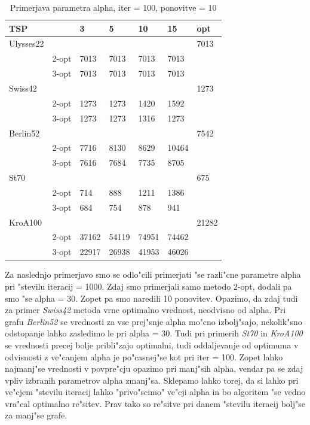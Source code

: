 \documentclass[12pt,a4paper]{amsart}
\theoremstyle{definition} %
\theoremstyle{plain} %
\begin{document}
\begin{table}[H]
\caption{Primerjava parametra alpha, iter = 100, ponovitve = 10}
\begin{tabular}{lllllll}
\rowcolor[HTML]{FFCCC9} 
TSP       &      & 3 & 5 & 10 & 15 &opt \\ \hline
Ulysses22 &      &   &   &    &  &7013  \\
          & 2-opt & 7013  &  7013 & 7013   & 7013   &\\
          & 3-opt &   7013&  7013 &  7013  &  7013 & \\
Swiss42   &      &   &   &    &   &1273 \\
	& 2-opt &   1273&  1273 &   1420 &  1592 & \\
          & 3-opt &  1273 &  1273 & 1316   &  1273 & \\
Berlin52 &      &   &   &    &   &7542 \\
	 & 2-opt &  7716 & 8130 &   8629 &  10464 & \\
          & 3-opt &  7616 &  7684 &  7735  & 8705  & \\
St70      &      &   &   &    &  & 675 \\
	& 2-opt &  714 &  888 &   1211 &  1386 & \\
          & 3-opt &  684 &  754 &   878 &   941& \\
KroA100   &      &   &   &    &  &21282  \\
	& 2-opt &  37162 &  54119 &   74951 &   74462& \\
          & 3-opt &  22917 &  26938 &  41953  & 46026  &
\end{tabular}
\end{table}

Za naslednjo primerjavo smo se odlo"cili primerjati "se razli"cne parametre alpha pri "stevilu iteracij = 1000. Zdaj smo primerjali samo metodo 2-opt, dodali pa smo "se alpha = 30. Zopet pa smo naredili 10 ponovitev. 
Opazimo, da zdaj tudi za primer \textit{Swiss42} metoda vrne optimalno vrednost, neodvisno od alpha. Pri grafu \textit{Berlin52} se vrednosti za vse prej"snje alpha mo"cno izbolj"sajo, nekolik"sno odstopanje lahko zasledimo le pri alpha = 30. Tudi pri primerih \textit{St70} in  \textit{KroA100} se vrednosti precej bolje pribli"zajo optimalni, tudi oddaljevanje od optimuma v odvisnosti z ve"canjem alpha je po"casnej"se kot pri iter = 100. Zopet lahko najmanj"se vrednosti v povpre"cju opazimo pri manj"sih alpha, vendar pa se zdaj vpliv izbranih parametrov alpha zmanj"sa. Sklepamo lahko torej, da si lahko pri ve"cjem "stevilu iteracij lahko "privo"scimo" ve"cji alpha in bo algoritem "se vedno vra"cal optimalno re"sitev. Prav tako so re"sitve pri danem "stevilu iteracij bolj"se za manj"se grafe. 
\end{document}
